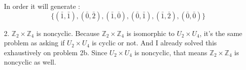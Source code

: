 \begin{enumerate}
\begin{enumerate}
  In order it will generate : 
$$\{(\bar{1},\bar{1}),(\bar{0},\bar{2}),(\bar{1},\bar{0}),(\bar{0},\bar{1}),(\bar{1},\bar{2}),(\bar{0},\bar{0})\}$$

2. $\mathds{Z}_2 \times \mathds{Z}_4$ is noncyclic. Because $\mathds{Z}_2 \times \mathds{Z}_4$ is isomorphic to $U_2 \times U_4$, it's the same problem as asking if $U_2 \times U_4$ is cyclic or not. And I already solved this exhaustively on problem 2b. Since $U_2 \times U_4$ is noncyclic, that means $\mathds{Z}_2 \times \mathds{Z}_4$ is noncyclic as well.

\end{enumerate}
\end{enumerate}


